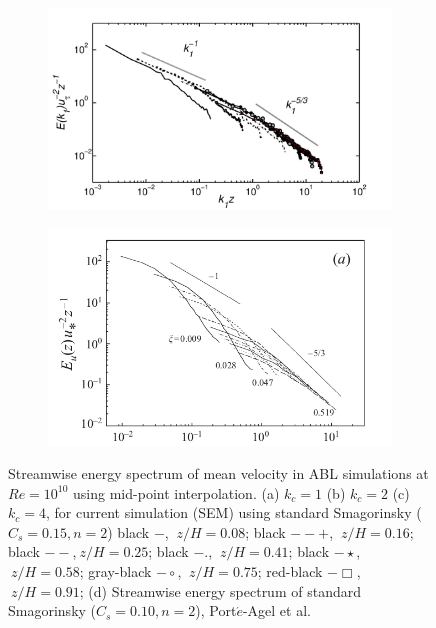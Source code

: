 \documentclass[times]{fldauth}
\begin{document}
\begin{figure}
\begin{subfigure}[t]{0.30\textwidth}
                \caption{}
                \label{fig:eng2}
        \end{subfigure}%
        \centering
        \begin{subfigure}[t]{0.30\textwidth}
                \includegraphics[width=\linewidth]{Figure/energy2.pdf}
                \caption{}
                \label{fig:eng4}
        \end{subfigure}
        \centering
            \begin{subfigure}[b]{0.42\textwidth}
                \includegraphics[width=\linewidth]{Figure/porte.png}
                 \caption{}
                 \label{fig:eng_port}
         \end{subfigure}
        \caption{Streamwise energy spectrum of mean velocity in ABL simulations at $Re = 10^{10}$ using mid-point interpolation. (a) $k_{c}=1$ (b) $k_{c}=2$ (c) $k_{c}=4$, for current simulation (SEM) using standard Smagorinsky ($C_s = 0.15, n = 2$) black $-$, $\ z/H = 0.08$; black $--+$, $\ z/H = 0.16$; black $--$,$\ z/H = 0.25$; black $-.$, $\ z/H = 0.41$; black $- \star$, $\ z/H = 0.58$; gray-black $-\circ$, $\ z/H = 0.75$; red-black $-\Box$, $\ z/H = 0.91$; (d) Streamwise energy spectrum of standard Smagorinsky ($C_s = 0.10, n = 2$), Port$\acute{e}$-Agel et al.~\cite{porte1fun}}\label{fig:energy}
\end{figure}
\end{document}
